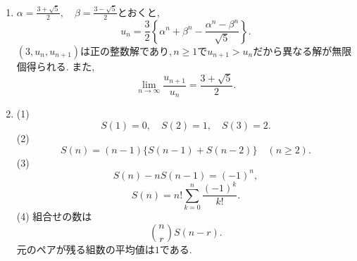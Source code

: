 \begin{enumerate}[label=\textbf{問\arabic*.},leftmargin=3.8em,format=\bookitemlink{practice-entrance}{answer}{problem}]
                (2)~$a_m\mid a_n\ \Longleftrightarrow\ m\mid n$である.

                (3)~$\gcd(a_m,a_n)=a_{\gcd(m,n)}$であり,
                \[
                 \boxed{\gcd(a_{2026},a_{3040})=a_2=2}.
                \]
          \item $\displaystyle\alpha=\frac{3+\sqrt5}2,\quad
                \beta=\frac{3-\sqrt5}2$とおくと,
                \[
                 \boxed{\displaystyle
                 u_n=\frac32\left\{
                 \alpha^n+\beta^n-
                 \frac{\alpha^n-\beta^n}{\sqrt5}
                 \right\}}.
                \]
                $(3,u_n,u_{n+1})$は正の整数解であり,\,$n\ge1$で$u_{n+1}>u_n$だから異なる解が無限個得られる.
                また,
                \[
                 \boxed{\displaystyle
                 \lim_{n\to\infty}\frac{u_{n+1}}{u_n}
                 =\frac{3+\sqrt5}2}.
                \]
          \item (1)
                \[
                 S(1)=0,\quad S(2)=1,\quad S(3)=2.
                \]
                (2)
                \[
                 S(n)=(n-1)\{S(n-1)+S(n-2)\}
                 \quad(n\ge2).
                \]
                (3)
                \[
                 S(n)-nS(n-1)=(-1)^n,
                \]
                \[
                 \boxed{S(n)=n!\sum_{k=0}^{n}\frac{(-1)^k}{k!}}.
                \]
                (4) 組合せの数は
                \[
                 \binom{n}{r}S(n-r).
                \]
                元のペアが残る組数の平均値は$1$である.
        \end{enumerate}

